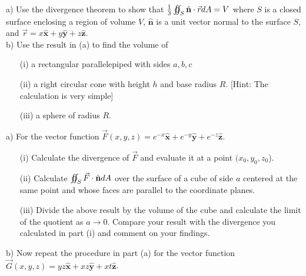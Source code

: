 \documentclass[11pt,letterpaper,boxed]{hmcpset}
\begin{document}
	\begin{solution}
		\vfill
	\end{solution}
	\newpage
	
	\begin{problem}[Schey: II-26]
		a) Use the divergence theorem to show that $\frac{1}{3} \varoiint_S \hat{\mathbf{n}} \cdot \vec{r} dA = V$ where $S$ is a closed surface enclosing a region of volume $V$, $\hat{\mathbf{n}}$ is a unit vector normal to the surface $S$, and $\vec{r} = x\hat{\mathbf{x}} + y\hat{\mathbf{y}} + z\hat{\mathbf{z}}$.\\
		b) Use the result in (a) to find the volume of
		\begin{enumerate}
			\item [(i)] a rectangular parallelepiped with sides $a, b, c$
			\item [(ii)] a right circular cone with height $h$ and base radius $R$. [Hint: The calculation is very simple]
			\item [(iii)] a sphere of radius $R$.
		\end{enumerate}

		
	\end{problem}
	
	\begin{solution}
		\vfill
	\end{solution}
	\newpage
	
	\begin{problem}
		a) For the vector function $\vec{F}(x,y,z) = e^{-x}\hat{\mathbf{x}} + e^{-y}\hat{\mathbf{y}} + e^{-z}\hat{\mathbf{z}}$.
		
		\begin{enumerate}
			\item [(i)] Calculate the divergence of $\vec{F}$ and evaluate it at a point $(x_0, y_0, z_0$).
			\item [(ii)] Calculate $\varoiint_S \vec{F}\cdot \hat{\mathbf{n}} dA$ over the surface of a cube of side $a$ centered at the same point and whose  faces are parallel to the coordinate planes.
			\item [(iii)]  Divide the above result by the volume of the cube and calculate the limit of the quotient as
			$a \rightarrow 0$. Compare your result with the divergence you calculated in part (i) and comment on your findings.
		\end{enumerate}
		b) Now repeat the procedure in part (a) for the vector function $\vec{G}(x,y,z) = yz\hat{\mathbf{x}} + xz\hat{\mathbf{y}} + xt\hat{\mathbf{z}}$.
	\end{problem}
	
	\begin{solution}
		\vfill
	\end{solution}
	\newpage
	
	
\end{document}
